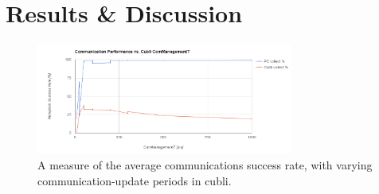 \chapter{Results \& Discussion}\label{sec:results}

\begin{figure}[ht]
   \centering
   \includegraphics[width=0.75\textwidth]{img/comStats.png}
   \caption{A measure of the average communications success rate, with varying communication-update periods in cubli.}
   \label{img:comStats}
\end{figure}